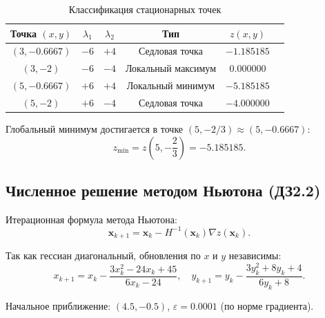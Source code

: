 \begin{table}[H]
    \centering
    \caption{Классификация стационарных точек}
    \label{tab:stationary}
    \begin{tabular}{|c|c|c|c|c|c|}
        \hline
        \textbf{Точка $(x, y)$} & \textbf{$\lambda_1$} & \textbf{$\lambda_2$} & \textbf{Тип} & \textbf{$z(x, y)$} \\
        \hline
        $(3, -0.6667)$ & $-6$ & $+4$ & Седловая точка & $-1.185185$ \\
        $(3, -2)$ & $-6$ & $-4$ & Локальный максимум & $0.000000$ \\
        $(5, -0.6667)$ & $+6$ & $+4$ & Локальный минимум & $-5.185185$ \\
        $(5, -2)$ & $+6$ & $-4$ & Седловая точка & $-4.000000$ \\
        \hline
    \end{tabular}
\end{table}

Глобальный минимум достигается в точке $(5, -2/3) \approx (5, -0.6667)$:
\begin{equation}
    z_{\min} = z\left(5, -\frac{2}{3}\right) = -5.185185.
\end{equation}

\subsection{Численное решение методом Ньютона (ДЗ2.2)}

Итерационная формула метода Ньютона:
\begin{equation}
    \mathbf{x}_{k+1} = \mathbf{x}_k - H^{-1}(\mathbf{x}_k) \nabla z(\mathbf{x}_k).
\end{equation}

Так как гессиан диагональный, обновления по $x$ и $y$ независимы:
\begin{equation}
    x_{k+1} = x_k - \frac{3x_k^2 - 24x_k + 45}{6x_k - 24}, \quad
    y_{k+1} = y_k - \frac{3y_k^2 + 8y_k + 4}{6y_k + 8}.
\end{equation}

Начальное приближение: $(4.5, -0.5)$, $\varepsilon = 0.0001$ (по норме градиента).

